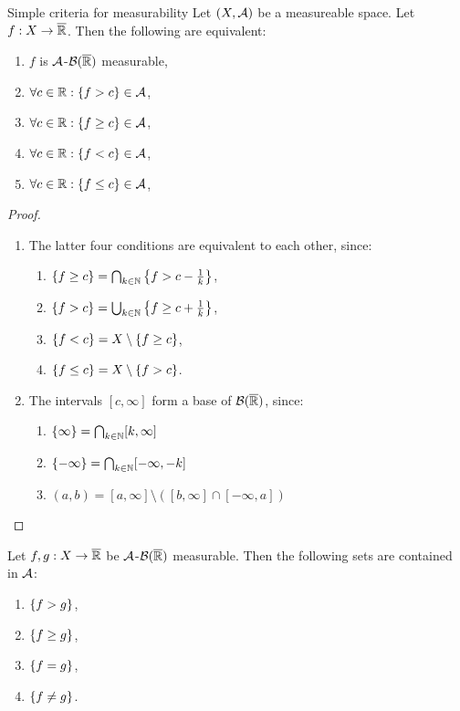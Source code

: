 \begin{importanttheorem}
	{Simple criteria for measurability}{} Let $(X, \mathcal{A})$ be a measureable space. Let $f : X \to \overline{{\mathbb{R}}}$. Then the following are equivalent:
	\begin{enumerate}
		\item $f$ is $\mathcal{A}$-$\mathcal{B}(\overline{{\mathbb{R}}})$ measurable,
		\item $\forall c \in \mathbb{R}: \qty{f > c} \in \mathcal{A}$,
		\item $\forall c \in \mathbb{R}: \qty{f \geq c} \in \mathcal{A}$,
		\item $\forall c \in \mathbb{R}: \qty{f < c} \in \mathcal{A}$,
		\item $\forall c \in \mathbb{R}: \qty{f \leq c} \in \mathcal{A}$,
	\end{enumerate}
\end{importanttheorem}
\begin{proof}
	\begin{enumerate}
		\item The latter four conditions are equivalent to each other, since:
		\begin{enumerate}
			\item $\qty{f \geq c} = \bigcap_{k \in \mathbb{N}} \qty{f > c - \frac{1}{k}}$,
			\item $\qty{f > c} = \bigcup_{k \in \mathbb{N}} \qty{f \geq c + \frac{1}{k}}$,
			\item $\qty{f < c} = X \setminus \qty{f \geq c}$,
			\item $\qty{f \leq c} = X \setminus \qty{f > c}$.
		\end{enumerate}
		\item The intervals $[c,\infty]$ form a base of $\mathcal{B}(\overline{{\mathbb{R}}})$, since:
		\begin{enumerate}
			\item $\qty{\infty} = \bigcap_{k \in \mathbb{N}} [k, \infty]$
			\item $\qty{-\infty} = \bigcap_{k \in \mathbb{N}} [-\infty,-k]$
			\item $(a,b) = [a,\infty] \setminus ([b, \infty] \cap [-\infty, a])$
		\end{enumerate}
	\end{enumerate}
\end{proof}
\begin{importanttheorem}{}{}
	Let $f,g : X \to \overline{{\mathbb{R}}}$ be $\mathcal{A}$-$\mathcal{B}(\overline{{\mathbb{R}}})$ measurable. Then the following sets are contained in $\mathcal{A}$:
	\begin{enumerate}
		\item $\qty{f > g}$,
		\item $\qty{f \geq g}$,
		\item $\qty{f = g}$,
		\item $\qty{f \neq g}$.
	\end{enumerate}
\end{importanttheorem}
